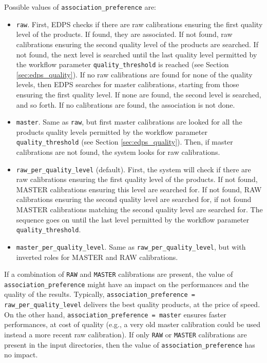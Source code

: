 Possible values of {\tt association\_preference} are:
\begin{itemize}
    \item {\tt raw}. First, EDPS checks if there are raw calibrations ensuring the first quality level of the products. If found, they are associated. If not found, raw calibrations ensuring the second quality level of the products are searched. If not found, the next level is searched until the last quality level permitted by the workflow parameter {\tt quality\_threshold} is reached (see Section \ref{sec:edps_quality}). If no raw calibrations are found for none of the quality levels, then EDPS searches for master calibrations, starting from those ensuring the first quality level.
    If none are found, the second level is searched, and so forth. If no calibrations are found, the association is not done.
    
    \item {\tt master}. Same as {\tt raw}, but first master calibrations are looked for all the products quality levels permitted by the workflow parameter {\tt quality\_threshold} (see Section \ref{sec:edps_quality}). Then, if master calibrations are not found, the system looks for raw calibrations.
    
    \item {\tt raw\_per\_quality\_level} (default).  First, the system will check if there are raw calibrations ensuring the first quality level of the products. If not found, MASTER calibrations ensuring this level are searched for. If not found, RAW calibrations ensuring the second quality level are searched for, if not found MASTER calibrations matching the second quality level are searched for. The sequence goes on until the last level permitted by the workflow parameter {\tt quality\_threshold}.
    
    \item {\tt master\_per\_quality\_level}.  Same as {\tt raw\_per\_quality\_level}, but with inverted roles for MASTER and RAW calibrations.
\end{itemize}

If a combination of {\tt RAW} and {\tt MASTER} calibrations are present, the  value of {\tt association\_preference} might have an impact on the performances and the quality of the results. Typically, {\tt association\_preference = raw\_per\_quality\_level} delivers the best  quality products, at the price of speed. On the other hand, {\tt association\_preference = master} ensures faster performances, at cost of quality (e.g., a very old master calibration could be used instead a more recent raw calibration).
If only {\tt RAW} or {\tt MASTER} calibrations are present in the input directories, then the value of {\tt association\_preference} has no impact.


